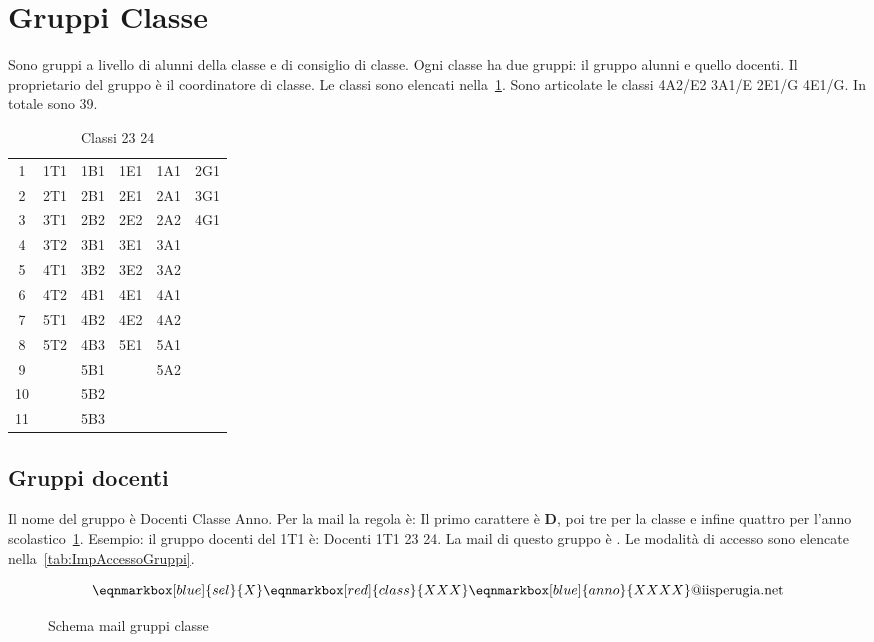 \section{Gruppi Classe}
Sono gruppi a livello di alunni della classe e di consiglio di classe. Ogni classe ha due gruppi: il gruppo alunni e quello docenti. Il proprietario del gruppo è il coordinatore di classe. Le classi sono elencati nella~\cref{tab:classi2324}. Sono articolate le classi 4A2/E2 3A1/E 2E1/G 4E1/G. In totale sono 39.
\begin{table}
	\centering
	\begin{tabular}{cccccc}
\toprule
1&1T1	& 1B1 & 1E1 & 1A1 &2G1  \\
2&2T1	& 2B1 & 2E1 & 2A1 & 3G1 \\
3&3T1	&  2B2& 2E2 & 2A2 & 4G1 \\
4&3T2	&  3B1& 3E1 & 3A1 &  \\
5&4T1	&  3B2&  3E2& 3A2 &  \\
6&4T2	& 4B1 & 4E1 & 4A1 &  \\
7&5T1	& 4B2 & 4E2 & 4A2 &  \\
8&5T2	& 4B3 & 5E1 & 5A1 &  \\
9&	&  5B1&   & 5A2 & \\
10&	&  5B2&    &  \\
11&	&  5B3&         &  \\
\bottomrule
\end{tabular}
	\caption{Classi 23 24}
	\label{tab:classi2324}
\end{table}
\subsection{Gruppi docenti}
Il nome del gruppo è Docenti Classe Anno. Per la mail la regola è: Il primo  carattere è \textbf{D}, poi  tre  per la classe e infine quattro  per l'anno scolastico~\cref{fig:schemamailgc}. 
Esempio: il gruppo docenti del 1T1 è: Docenti 1T1 23 24. La mail di questo gruppo è . Le  modalità di accesso  sono elencate nella~\cref{tab:ImpAccessoGruppi}.
\begin{figure}
		\vspace{6em}
\begin{equation*}
	\eqnmarkbox[blue]{sel}{X}\eqnmarkbox[red]{class}{XXX}\eqnmarkbox[blue]{anno}{XXXX}\text{@iisperugia.net}
\end{equation*}
\vspace{4em}
	\caption{Schema mail gruppi classe}
	\label{fig:schemamailgc}
\end{figure}

